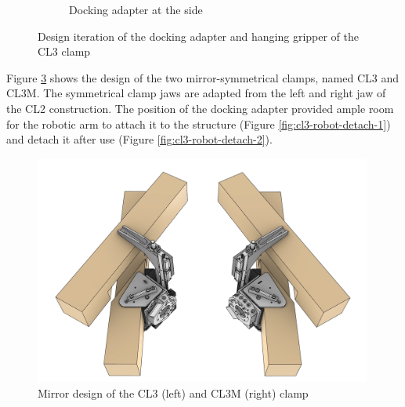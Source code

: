 \begin{figure}
\begin{subfigure}[b]{0.49\textwidth}
        \caption{Docking adapter at the side}
        \label{fig:l3-docking-adapter-2}
    \end{subfigure}
    \caption{Design iteration of the docking adapter and hanging gripper of the CL3 clamp}
    \label{fig:cl3-docking-adapter-design}
\end{figure}

Figure \ref{fig:cl3-cl3m-mirror-design} shows the design of the two mirror-symmetrical clamps, named CL3 and CL3M. The symmetrical clamp jaws are adapted from the left and right jaw of the CL2 construction. The position of the docking adapter provided ample room for the robotic arm to attach it to the structure (Figure \ref{fig:cl3-robot-detach-1}) and detach it after use (Figure \ref{fig:cl3-robot-detach-2}). 

\begin{figure}
    \centering
    \includegraphics[width=0.99\textwidth]{images/05/cl3-mirror-design.jpg}
    \caption[Mirror design of the CL3 and CL3M clamp]{Mirror design of the CL3 (left) and CL3M (right) clamp}
    \label{fig:cl3-cl3m-mirror-design}
\end{figure}

